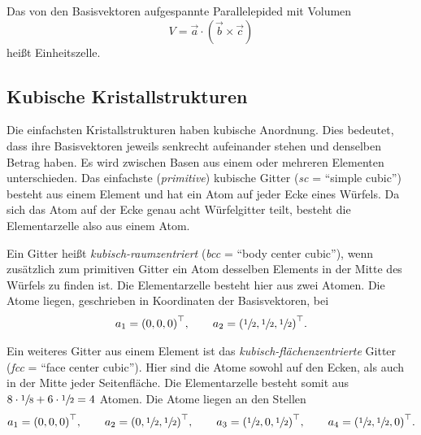 Das von den Basisvektoren aufgespannte Parallelepided mit Volumen
\begin{equation}
  V = \vec{a} \cdot \left(\vec{b} \times \vec{c}\right)
\end{equation}
heißt Einheitszelle.


\subsection{Kubische Kristallstrukturen}%
\label{sub:kubische_kristallstrukturen}
Die einfachsten Kristallstrukturen haben kubische Anordnung.
Dies bedeutet, dass ihre Basisvektoren jeweils senkrecht aufeinander stehen und denselben Betrag haben.
Es wird zwischen Basen aus einem oder mehreren Elementen unterschieden.
Das einfachste (\textit{primitive}) kubische Gitter (\textit{sc} = \enquote{simple cubic})
besteht aus einem Element und hat ein Atom auf jeder Ecke eines Würfels.
Da sich das Atom auf der Ecke genau acht Würfelgitter teilt,
besteht die Elementarzelle also aus einem Atom.

Ein Gitter heißt \textit{kubisch-raumzentriert} (\textit{bcc} = \enquote{body center cubic}),
wenn zusätzlich zum primitiven Gitter ein Atom desselben Elements in der Mitte des Würfels zu finden ist.
Die Elementarzelle besteht hier aus zwei Atomen.
Die Atome liegen, geschrieben in Koordinaten der Basisvektoren, bei
\begin{align*}
  a_1 = {\left(0, 0, 0\right)}^\top, \hspace{2em} a_2 = {\left(\sfrac{1}{2}, \sfrac{1}{2}, \sfrac{1}{2}\right)}^\top.
\end{align*}

Ein weiteres Gitter aus einem Element ist das \textit{kubisch-flächenzentrierte} Gitter (\textit{fcc} = \enquote{face center cubic}).
Hier sind die Atome sowohl auf den Ecken, als auch in der Mitte jeder Seitenfläche.
Die Elementarzelle besteht somit aus $8 \cdot \sfrac{1}{8} + 6 \cdot \sfrac{1}{2} = 4$ Atomen.
Die Atome liegen an den Stellen
\begin{align*}
  a_1 = {\left(0, 0, 0\right)}^\top, \hspace{2em}
  a_2 = {\left(0, \sfrac{1}{2}, \sfrac{1}{2}\right)}^\top, \hspace{2em}
  a_3 = {\left(\sfrac{1}{2}, 0, \sfrac{1}{2}\right)}^\top, \hspace{2em}
  a_4 = {\left(\sfrac{1}{2}, \sfrac{1}{2}, 0\right)}^\top.
\end{align*}

